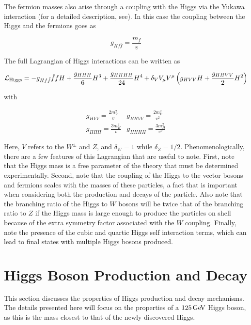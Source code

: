 The fermion masses also arise through a coupling with the Higgs via the Yukawa interaction (for a detailed description, see\cite{Dawson}). In this case the coupling between the Higgs and the fermions goes as 

\begin{equation}
\label{eqn:higgs-fermions}
g_{Hf\bar{f}} = \frac{m_f}{v}
\end{equation} 

The full Lagrangian of Higgs interactions can be written as 

\begin{equation}
\mathcal{L}_{\rm Higgs} = -g_{Hf\bar{f}}\bar{f}fH + \frac{g_{HHH}}{6}H^3 + \frac{g_{HHHH}}{24}H^4 + \delta_V V_\mu V^\mu\left(g_{HVV} H + \frac{g_{HHVV}}{2}H^2\right)
\end{equation}

with 

\begin{equation}
\begin{array}{cc}
g_{HVV} = \frac{2m_V^2}{v} & g_{HHVV} = \frac{2m_V^2}{v^2} \\ 
g_{HHH} = \frac{3m_H^2}{v} & g_{HHHH} = \frac{3m_H^2}{v^2}
\end{array}
\end{equation}

Here, $V$ refers to the $W^{\pm}$ and $Z$, and $\delta_{W} = 1$ while $\delta_Z = 1/2$. Phenomenologically, there are a few features of this Lagrangian that are useful to note. First, note that the Higgs mass is a free parameter of the theory that must be determined experimentally. Second, note that the coupling of the Higgs to the vector bosons and fermions scales with the masses of these particles, a fact that is important when considering both the production and decays of the particle. Also note that the branching ratio of the Higgs to $W$ bosons will be twice that of the branching ratio to $Z$ if the Higgs mass is large enough to produce the particles on shell because of the extra symmetry factor associated with the $W$ coupling. Finally, note the presence of the cubic and quartic Higgs self interaction terms, which can lead to final states with multiple Higgs bosons produced. 

\section{Higgs Boson Production and Decay}

This section discusses the properties of Higgs production and decay mechanisms. The details presented here will focus on the properties of a $125 \GeV$ Higgs boson, as this is the mass closest to that of the newly discovered Higgs. 

